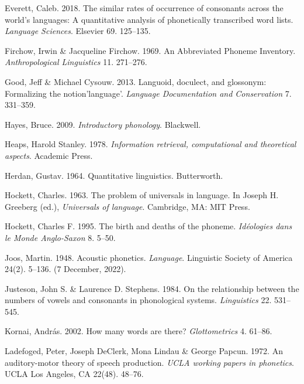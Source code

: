 \documentclass[
]{article}
\newlength{\cslhangindent}
\newlength{\cslentryspacingunit} %
\newenvironment{CSLReferences}[2] %
 {%
  \setlength{\parindent}{0pt}
  \ifodd #1
  \let\oldpar\par
  \def\par{\hangindent=\cslhangindent\oldpar}
  \fi
  \setlength{\parskip}{#2\cslentryspacingunit}
 }%
 {}
\begin{document}
\begin{CSLReferences}{1}{0}
\leavevmode{}%
Everett, Caleb. 2018. The similar rates of occurrence of consonants
across the world's languages: A quantitative analysis of phonetically
transcribed word lists. \emph{Language Sciences}. Elsevier 69. 125--135.

\leavevmode{}%
Firchow, Irwin \& Jacqueline Firchow. 1969. {An Abbreviated Phoneme
Inventory}. \emph{Anthropological Linguistics} 11. 271--276.

\leavevmode{}%
Good, Jeff \& Michael Cysouw. 2013. Languoid, doculect, and glossonym:
Formalizing the notion'language'. \emph{Language Documentation and
Conservation} 7. 331--359.

\leavevmode{}%
Hayes, Bruce. 2009. \emph{Introductory phonology}. Blackwell.

\leavevmode{}%
Heaps, Harold Stanley. 1978. \emph{Information retrieval, computational
and theoretical aspects}. Academic Press.

\leavevmode{}%
Herdan, Gustav. 1964. Quantitative linguistics. Butterworth.

\leavevmode{}%
Hockett, Charles. 1963. The problem of universals in language. In Joseph
H. Greeberg (ed.), \emph{Universals of language}. Cambridge, MA: MIT
Press.

\leavevmode{}%
Hockett, Charles F. 1995. The birth and deaths of the phoneme.
\emph{Id{é}ologies dans le Monde Anglo-Saxon} 8. 5--50.

\leavevmode{}%
Joos, Martin. 1948. Acoustic phonetics. \emph{Language}. Linguistic
Society of America 24(2). 5--136. (7 December, 2022).

\leavevmode{}%
Justeson, John S. \& Laurence D. Stephens. 1984. On the relationship
between the numbers of vowels and consonants in phonological systems.
\emph{Linguistics} 22. 531--545.

\leavevmode{}%
Kornai, András. 2002. {How many words are there?} \emph{Glottometrics}
4. 61--86.

\leavevmode{}%
Ladefoged, Peter, Joseph DeClerk, Mona Lindau \& George Papcun. 1972. An
auditory-motor theory of speech production. \emph{{UCLA} working papers
in phonetics}. UCLA Los Angeles, CA 22(48). 48--76.


\end{CSLReferences}
\end{document}
